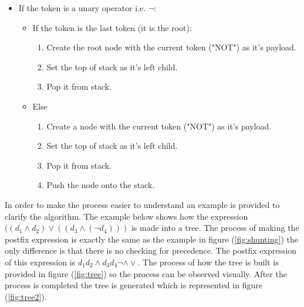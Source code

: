 \documentclass[10pt, a4paper, titlepage]{article}
\begin{document}
\begin{itemize}
\begin{itemize}
\end{itemize}
\item If the token is a unary operator i.e. $ \neg $:
\begin{itemize}
\item If the token is the last token (it is the root):
\begin{enumerate}
\item Create the root node with the current token ("NOT") as it's payload.
\item Set the top of stack as it's left child.
\item Pop it from stack.
\end{enumerate}

\item Else
\begin{enumerate}
\item Create a node with the current token ("NOT") as it's payload.
\item Set the top of stack as it's left child.
\item Pop it from stack.
\item Push the node onto the stack.
\end{enumerate}

\end{itemize}

\end{itemize}

In order to make the process easier to understand an example is provided to clarify the algorithm. The example below shows how the expression $( (d_{1} \wedge d_{2}) \vee ((d_{3} \wedge (\neg d_{4})) )  $ is made into a tree. The process of making the postfix expression is exactly the same as the example in figure (\ref{fig:shunting}) the only difference is that there is no checking for precedence. The postfix expression of this expression is $ d_{1} d_{2} \wedge d_{3} d_{4} \neg \wedge \vee $. The process of how the tree is built is provided in figure (\ref{fig:tree}) so the process can be observed visually. After the process is completed the tree is generated which is represented in figure (\ref{fig:tree2}).
 
\end{document}

